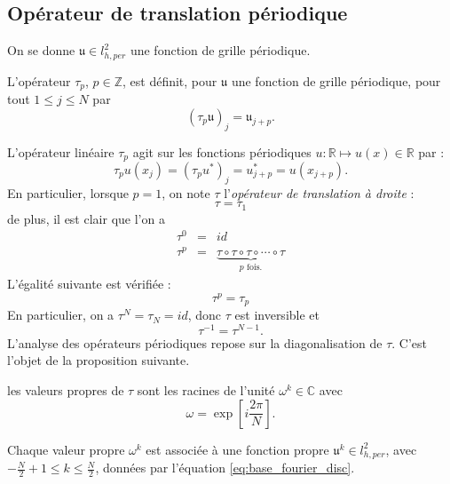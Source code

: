 \subsection{Opérateur de translation périodique}
On se donne $\mathfrak{u} \in l^2_{h,per}$ une fonction de grille périodique.
\begin{definition}
L'opérateur $\tau_p$, $p \in \mathbb{Z}$, est définit, pour $\mathfrak{u}$ une fonction de grille périodique, pour tout $1 \leq j \leq N$ par
\begin{equation}
(\tau_p \mathfrak{u})_j = \mathfrak{u}_{j+p}.
\end{equation}
\end{definition}
L'opérateur linéaire $\tau_p$ agit sur les fonctions périodiques $u : \mathbb{R} \mapsto u(x) \in \mathbb{R}$ par :
\begin{equation}
\tau_p u(x_j) = (\tau_p u^*)_j = u^*_{j+p} = u(x_{j+p}).
\end{equation}
En particulier, lorsque $p=1$, on note $\tau$ l'\textit{opérateur de translation à droite} :
\begin{equation}
\tau = \tau_{1}
\end{equation}
de plus, il est clair que l'on a
\begin{equation}
\begin{array}{rcl}
\tau^0 & = & id\\
\tau^p & = & \underbrace{\tau \circ \tau \circ \tau \circ \cdots \circ \tau}_{p \text{ fois.}}
\end{array}
\end{equation}
L'égalité suivante est vérifiée :
\begin{equation}
\tau^p = \tau_p
\end{equation}
En particulier, on a $\tau^N = \tau_N = id$, donc $\tau$ est inversible et
\begin{equation}
\tau^{-1} = \tau^{N-1}.
\end{equation}
L'analyse des opérateurs périodiques repose sur la diagonalisation de $\tau$. C'est l'objet de la proposition suivante.

\begin{proposition}
les valeurs propres de $\tau$ sont les racines de l'unité $\omega^k \in \mathbb{C}$ avec
\begin{equation}
\omega = \exp \left[ i \dfrac{2 \pi}{N} \right].
\end{equation}

Chaque valeur propre $\omega^k$ est associée à une fonction propre $\mathfrak{u}^k \in l^2_{h,per}$, avec $-\frac{N}{2}+1 \leq k \leq \frac{N}{2}$, données par l'équation \ref{eq:base_fourier_disc}.
\label{prop:eigenvaluevector_tau}
\end{proposition}

